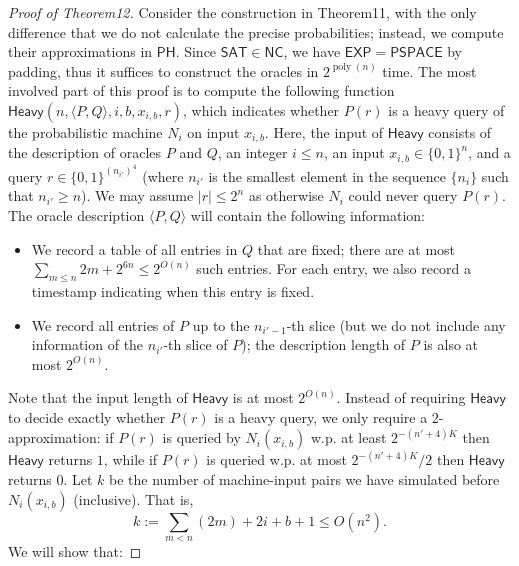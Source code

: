 \begin{proof}[Proof of Theorem12]
Consider the construction in Theorem11, with the only difference that we do not calculate the precise probabilities; instead, we compute their approximations in $\mathsf{PH}$. Since $\mathsf{SAT}\in\mathsf{NC}$, we have $\mathsf{EXP}=\mathsf{PSPACE}$ by padding, thus it suffices to construct the oracles in $2^{\operatorname{poly}(n)}$ time.
The most involved part of this proof is to compute the following function $\mathsf{Heavy}(n,\langle P,Q\rangle,i,b,x_{i,b},r)$, which indicates whether $P(r)$ is a heavy query of the probabilistic machine $N_i$ on input $x_{i,b}$. Here, the input of $\mathsf{Heavy}$ consists of the description of oracles $P$ and $Q$, an integer $i\leq n$, an input $x_{i,b}\in\{0,1\}^n$, and a query $r\in\{0,1\}^{(n_{i'})^4}$ (where $n_{i'}$ is the smallest element in the sequence $\{n_i\}$ such that $n_{i'}\geq n$). We may assume $|r|\leq2^n$ as otherwise $N_i$ could never query $P(r)$. The oracle description $\langle P,Q\rangle$ will contain the following information:
\begin{itemize}
\item We record a table of all entries in $Q$ that are fixed; there are at most $\sum_{m\leq n}2m+2^{6n}\leq2^{O(n)}$ such entries. For each entry, we also record a timestamp indicating when this entry is fixed.
\item We record all entries of $P$ up to the $n_{i'-1}$-th slice (but we do not include any information of the $n_{i'}$-th slice of $P$); the description length of $P$ is also at most $2^{O(n)}$.
\end{itemize}
Note that the input length of $\mathsf{Heavy}$ is at most $2^{O(n)}$. Instead of requiring $\mathsf{Heavy}$ to decide exactly whether $P(r)$ is a heavy query, we only require a $2$-approximation: if $P(r)$ is queried by $N_i(x_{i,b})$ w.p. at least $2^{-(n'+4)K}$ then $\mathsf{Heavy}$ returns $1$, while if $P(r)$ is queried w.p. at most $2^{-(n'+4)K}/2$ then $\mathsf{Heavy}$ returns $0$.
Let $k$ be the number of machine-input pairs we have simulated before $N_i(x_{i,b})$ (inclusive). That is,
\[k:=\sum_{m<n}(2m)+2i+b+1\leq O(n^2).\]
We will show that:

\end{proof}
